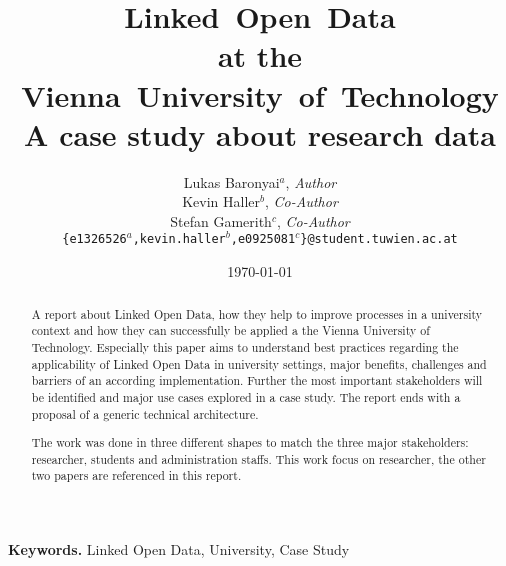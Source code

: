 \documentclass[pdftex,a4paper,10pt]{article}
\begin{document}
\pagestyle{plain}
\setlength{\tabcolsep}{10pt}
\title{\textbf{L}inked~\textbf{O}pen~\textbf{D}ata\\
	   at the\\
	   Vienna~University~of~Technology\\
	   \large A case study about research data}
\author{Lukas Baronyai$^a$, \textit{Author}\\
		Kevin Haller$^b$, \textit{Co-Author}\\
		Stefan Gamerith$^c$, \textit{Co-Author}\\
	\texttt{\{e1326526$^a$,kevin.haller$^b$,e0925081$^c$\}@student.tuwien.ac.at}}
\date{\today}

\maketitle

\begin{abstract}
A report about Linked Open Data, how they help to improve processes in a university context and how they can successfully be applied a the Vienna University of Technology. Especially this paper aims to understand best practices regarding the applicability of Linked Open Data in university settings, major benefits, challenges and barriers of an according implementation. Further the most important stakeholders will be identified and major use cases explored in a case study. The report ends with a proposal of a generic technical architecture.

The work was done in three different shapes to match the three major stakeholders: researcher, students and administration staffs. This work focus on researcher, the other two papers are referenced in this report.
\end{abstract}

\vfill
\begin{center}
\textbf{Keywords.} Linked Open Data, University, Case Study
\end{center}

\newpage
\tableofcontents
\cleardoublepage
\listoffigures
{}







\end{document}
